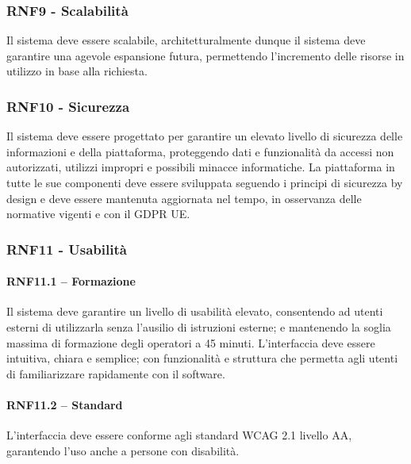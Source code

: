 \subsubsection{RNF9 - Scalabilità}
Il sistema deve essere scalabile, architetturalmente dunque il sistema deve garantire una agevole espansione futura, permettendo l’incremento delle risorse in utilizzo in base alla richiesta.

\subsubsection{RNF10 - Sicurezza}
Il sistema deve essere progettato per garantire un elevato livello di sicurezza delle informazioni e della piattaforma, proteggendo dati e funzionalità da accessi non autorizzati, utilizzi impropri e possibili minacce informatiche. La piattaforma in tutte le sue componenti deve essere sviluppata seguendo i principi di sicurezza by design e deve essere mantenuta aggiornata nel tempo, in osservanza delle normative vigenti e con il GDPR UE.

\newpage

\subsubsection{RNF11 - Usabilità}
\paragraph{RNF11.1 – Formazione}
Il sistema deve garantire un livello di usabilità elevato, consentendo ad utenti esterni di utilizzarla senza l’ausilio di istruzioni esterne; e mantenendo la soglia massima di formazione degli operatori a 45 minuti. L’interfaccia deve essere intuitiva, chiara e semplice; con funzionalità e struttura che permetta agli utenti di familiarizzare rapidamente con il software.
\paragraph{RNF11.2 – Standard}
 L’interfaccia deve essere conforme agli standard WCAG 2.1 livello AA, garantendo l’uso anche a persone con disabilità.
